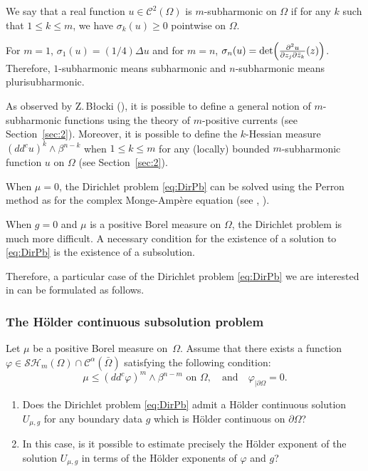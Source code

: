 \documentclass[11pt]{article}
\numberwithin{equation}{section}
\theoremstyle{definition}
\newcommand{\Cc}{\mathcal{C}}
\theoremstyle{plain}
\theoremstyle{definition}
\begin{document}
We say that a real function $u \in \Cc^2 (\Omega)$ is $m$-subharmonic on $\Omega$ if for any $k$ such that $1 \leq k \leq m$, we have $\sigma_k (u) \geq 0$ pointwise on $\Omega$.

For $m= 1$, $\sigma_1 (u) = (1 \slash 4) \Delta u$ and for $m = n$, $\sigma_n (u) = \det \Bigl(\frac{\partial^2 u }{\partial z_j \partial \bar{z}_k} (z)\Bigr)$.
Therefore, $1$-subharmonic means subharmonic and $n$-subharmonic means plurisubharmonic.

As observed by Z.\,B\l ocki (\cite{Bl05}), it is possible to define a general notion of $m$-subharmonic functions using the theory of $m$-positive currents (see Section~\ref{sec:2}). Moreover, it is possible to define the $k$-Hessian measure $(dd^c u)^k \wedge \beta^{n - k}$ when \hbox{$1 \leq k \leq m$} for any (locally) bounded $m$-subharmonic function $u$ on $\Omega$ (see Section~\ref{sec:2}).

When $\mu = 0$, the Dirichlet problem \eqref{eq:DirPb} can be solved using the Perron method as for the complex Monge-Ampère equation (see \cite{Bl05}, \cite{Ch16a}).

When $g = 0$ and $\mu$ is a positive Borel measure on $\Omega$, the Dirichlet problem is much more difficult. A necessary condition for the existence of a solution to \eqref{eq:DirPb} is the existence of a subsolution.

Therefore, a particular case of the Dirichlet problem \eqref{eq:DirPb} we are interested in can be formulated as follows.

\subsubsection*{The Hölder continuous subsolution problem}
Let $\mu$ be a positive Borel measure on~$\Omega$. Assume that there exists a function $\varphi \in \mathcal{SH}_m (\Omega) \cap \Cc^{\alpha} (\bar{\Omega})$ satisfying the following condition:
\begin{equation} \label{eq:subsolution}
\mu \leq (dd^c \varphi)^m \wedge \beta^{n - m}\text{ on }\Omega, \quad \text{and}\quad \varphi_{\mid \partial \Omega} = 0.
\end{equation}

\begin{enumerate}
\item
Does the Dirichlet problem \eqref{eq:DirPb} admit a Hölder continuous solution $U_{\mu,g}$ for any boundary data $g$ which is Hölder continuous on $\partial{\Omega}$?

\item
In this case, is it possible to estimate precisely the Hölder exponent of the solution $U_{\mu,g}$ in terms of the Hölder exponents of $\varphi$ and $g$?
\end{enumerate}
\end{document}
